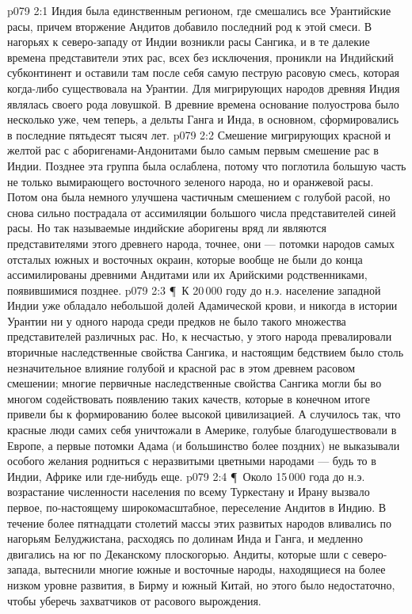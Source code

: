 \vs p079 2:1 Индия была единственным регионом, где смешались все Урантийские расы, причем вторжение Андитов добавило последний род к этой смеси. В нагорьях к северо\hyp{}западу от Индии возникли расы Сангика, и в те далекие времена представители этих рас, всех без исключения, проникли на Индийский субконтинент и оставили там после себя самую пеструю расовую смесь, которая когда\hyp{}либо существовала на Урантии. Для мигрирующих народов древняя Индия являлась своего рода ловушкой. В древние времена основание полуострова было несколько уже, чем теперь, а дельты Ганга и Инда, в основном, сформировались в последние пятьдесят тысяч лет.
\vs p079 2:2 Смешение мигрирующих красной и желтой рас с аборигенами\hyp{}Андонитами было самым первым смешение рас в Индии. Позднее эта группа была ослаблена, потому что поглотила большую часть не только вымирающего восточного зеленого народа, но и оранжевой расы. Потом она была немного улучшена частичным смешением с голубой расой, но снова сильно пострадала от ассимиляции большого числа представителей синей расы. Но так называемые индийские аборигены вряд ли являются представителями этого древнего народа, точнее, они --- потомки народов самых отсталых южных и восточных окраин, которые вообще не были до конца ассимилированы древними Андитами или их Арийскими родственниками, появившимися позднее.
\vs p079 2:3 \P\ К 20\,000 году до н.э. население западной Индии уже обладало небольшой долей Адамической крови, и никогда в истории Урантии ни у одного народа среди предков не было такого множества представителей различных рас. Но, к несчастью, у этого народа превалировали вторичные наследственные свойства Сангика, и настоящим бедствием было столь незначительное влияние голубой и красной рас в этом древнем расовом смешении; многие первичные наследственные свойства Сангика могли бы во многом содействовать появлению таких качеств, которые в конечном итоге привели бы к формированию более высокой цивилизацией. А случилось так, что красные люди самих себя уничтожали в Америке, голубые благодушествовали в Европе, а первые потомки Адама (и большинство более поздних) не выказывали особого желания родниться с неразвитыми цветными народами --- будь то в Индии, Африке или где\hyp{}нибудь еще.
\vs p079 2:4 \P\ Около 15\,000 года до н.э. возрастание численности населения по всему Туркестану и Ирану вызвало первое, по\hyp{}настоящему широкомасштабное, переселение Андитов в Индию. В течение более пятнадцати столетий массы этих развитых народов вливались по нагорьям Белуджистана, расходясь по долинам Инда и Ганга, и медленно двигались на юг по Деканскому плоскогорью. Андиты, которые шли с северо\hyp{}запада, вытеснили многие южные и восточные народы, находящиеся на более низком уровне развития, в Бирму и южный Китай, но этого было недостаточно, чтобы уберечь захватчиков от расового вырождения.
